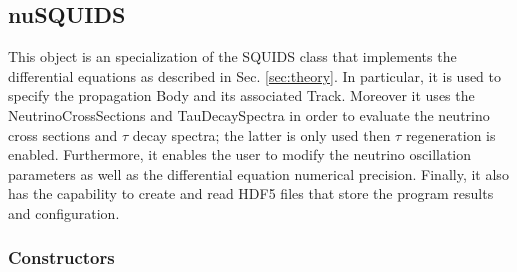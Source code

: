 \subsection{nuSQUIDS}

This object is an specialization of the {\ttf SQUIDS} class \citep{SQUIDS} that implements the
differential equations as described in Sec. \ref{sec:theory}. In particular, it is used to specify the propagation {\ttf Body} and its associated {\ttf Track}. Moreover it uses the {\ttf NeutrinoCrossSections} and {\ttf TauDecaySpectra} in order to evaluate the neutrino cross sections and $\tau$ decay spectra; the latter is only used then {\it $\tau$} regeneration is enabled. Furthermore, it enables the user to modify the neutrino oscillation parameters as well as the differential equation numerical precision. Finally, it also has the capability to create and read HDF5 files that store the program results and configuration.

\subsubsection{Constructors}


